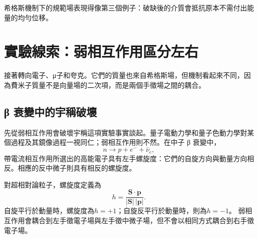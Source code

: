 希格斯機制下的規範場表現得像第三個例子：破缺後的介質會抵抗原本不需付出能量的均勻位移。

\begin{classroomqa}
\end{classroomqa}

\begin{classroomqa}
\end{classroomqa}

\section{實驗線索：弱相互作用區分左右}

接著轉向電子、{\proseunicodefont μ}子和夸克。它們的質量也來自希格斯場，但機制看起來不同，因為費米子質量不是向量場的二次項，而是兩個手徵場之間的耦合。

\subsection{{\proseunicodefont β} 衰變中的宇稱破壞}

先從弱相互作用會破壞宇稱這項實驗事實談起。量子電動力學和量子色動力學對某個過程及其鏡像過程一視同仁；弱相互作用則不然。在中子 {\proseunicodefont β} 衰變中，
\begin{equation}
  n\longrightarrow p+e^-+\bar\nu_e,
  \label{eq:l09-beta-decay}
\end{equation}
帶電流相互作用所選出的高能電子具有左手螺旋度：它們的自旋方向與動量方向相反。相應的反中微子則具有相反的螺旋度。

對超相對論粒子，螺旋度定義為
\begin{equation}
  h=\frac{\bm S\cdot\bm p}{|\bm S|\,|\bm p|}.
\end{equation}
自旋平行於動量時，螺旋度為\(h=+1\)；自旋反平行於動量時，則為\(h=-1\)。
弱相互作用會耦合到左手徵電子場與左手徵中微子場，但不會以相同方式耦合到右手徵電子場。

